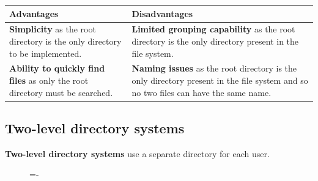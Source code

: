 \documentclass[a4paper]{systems-software}
\begin{document}
\begin{longtabu} to \textwidth {| X[1,l] | X[1,l] |}
    \hline
    \textbf{Advantages} & \textbf{Disadvantages}
	\\ \hline
	\textbf{Simplicity} as the root directory is the only directory to be implemented. &
	\textbf{Limited grouping capability} as the root directory is the only directory present in the file system.
	\\ \hline
	\textbf{Ability to quickly find files} as only the root directory must be searched. &
	\textbf{Naming issues} as the root directory is the only directory present in the file system and so no two files can have the same name.
	\\ \hline
\end{longtabu}


\newpage

\subsection*{Two-level directory systems}

\textbf{Two-level directory systems} use a separate directory for each user.

\begin{figure}[H]
  \lineskip=-\fboxrule
\end{figure}
\end{document}
